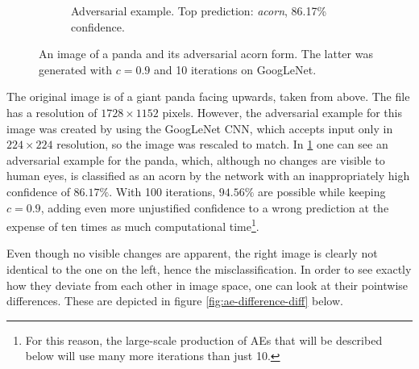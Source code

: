 \documentclass[11pt, a4paper]{article}
\begin{document}
\begin{figure}[h!tb]
\begin{subfigure}[t]{0.45\textwidth}
        \caption{Adversarial example. Top prediction: \emph{acorn}, 86.17\% confidence.}
        \label{fig:ae-example-ae}
    \end{subfigure}
    \caption[Adversarial example of a panda as an acorn, generated with iterative FGSM]{An image of a panda and its adversarial acorn form. The latter was generated with $c = 0.9$ and 10 iterations on GoogLeNet.}
    \label{fig:ae-example}
\end{figure}

The original image is of a giant panda facing upwards, taken from above. The file has a resolution of $1728 \times 1152$ pixels. However, the adversarial example for this image was created by using the GoogLeNet CNN, which accepts input only in $224 \times 224$ resolution, so the image was rescaled to match. In \ref{fig:ae-example-ae} one can see an adversarial example for the panda, which, although no changes are visible to human eyes, is classified as an acorn by the network with an inappropriately high confidence of $86.17\%$. With 100 iterations, $94.56\%$ are possible while keeping $c = 0.9$, adding even more unjustified confidence to a wrong prediction at the expense of ten times as much computational time\footnote{For this reason, the large-scale production of AEs that will be described below will use many more iterations than just 10.}.

Even though no visible changes are apparent, the right image is clearly not identical to the one on the left, hence the misclassification. In order to see exactly how they deviate from each other in image space, one can look at their pointwise differences. These are depicted in figure \ref{fig:ae-difference-diff} below.
\end{document}

